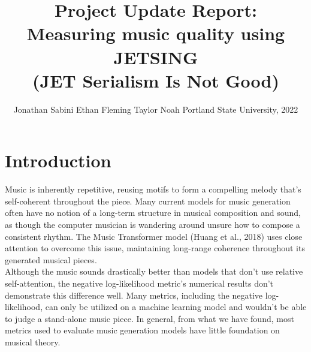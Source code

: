 \documentclass[11pt]{article}
\title{Project Update Report: \\ Measuring music quality using JETSING \\ (JET Serialism Is Not Good) }
\author{Jonathan Sabini \And Ethan Fleming \And Taylor Noah 
\AND
Portland State University, 2022}
\begin{document}
\maketitle

\section{Introduction}
Music is inherently repetitive, reusing motifs to form a compelling melody that's self-coherent throughout the piece. Many current models for music generation often have no notion of a long-term structure in musical composition and sound, as though the computer musician is wandering around unsure how to compose a consistent rhythm. The Music Transformer model (Huang et al., 2018) uses close attention to overcome this issue, maintaining long-range coherence throughout its generated musical pieces.\\ \indent Although the music sounds drastically better than models that don't use relative self-attention, the negative log-likelihood metric's numerical results don't demonstrate this difference well. Many metrics, including the negative log-likelihood, can only be utilized on a machine learning model and wouldn't be able to judge a stand-alone music piece. In general, from what we have found, most metrics used to evaluate music generation models have little foundation on musical theory.
\end{document}
